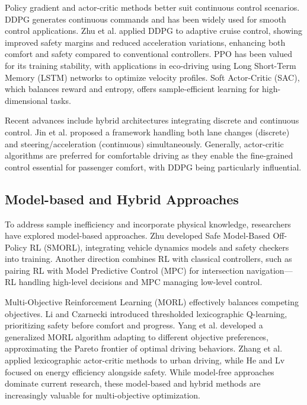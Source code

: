 \documentclass[12pt,a4paper]{article}
\begin{document}
Policy gradient and actor-critic methods better suit continuous control scenarios. DDPG generates continuous commands and has been widely used for smooth control applications. Zhu et al.\cite{zhu2020} applied DDPG to adaptive cruise control, showing improved safety margins and reduced acceleration variations, enhancing both comfort and safety compared to conventional controllers. PPO has been valued for its training stability, with applications in eco-driving using Long Short-Term Memory (LSTM) networks to optimize velocity profiles\cite{zhu2021}. Soft Actor-Critic (SAC), which balances reward and entropy, offers sample-efficient learning for high-dimensional tasks.

Recent advances include hybrid architectures integrating discrete and continuous control. Jin et al.\cite{jin2025} proposed a framework handling both lane changes (discrete) and steering/acceleration (continuous) simultaneously. Generally, actor-critic algorithms are preferred for comfortable driving as they enable the fine-grained control essential for passenger comfort, with DDPG\cite{lillicrap2016} being particularly influential.

\subsection{Model-based and Hybrid Approaches}
To address sample inefficiency and incorporate physical knowledge, researchers have explored model-based approaches. Zhu\cite{zhu2021} developed Safe Model-Based Off-Policy RL (SMORL), integrating vehicle dynamics models and safety checkers into training. Another direction combines RL with classical controllers, such as pairing RL with Model Predictive Control (MPC) for intersection navigation—RL handling high-level decisions and MPC managing low-level control\cite{survey2023}.

Multi-Objective Reinforcement Learning (MORL) effectively balances competing objectives. Li and Czarnecki\cite{li2019} introduced thresholded lexicographic Q-learning, prioritizing safety before comfort and progress. Yang et al.\cite{yang2019} developed a generalized MORL algorithm adapting to different objective preferences, approximating the Pareto frontier of optimal driving behaviors. Zhang et al.\cite{zhang2023} applied lexicographic actor-critic methods to urban driving, while He and Lv\cite{he2023} focused on energy efficiency alongside safety. While model-free approaches dominate current research, these model-based and hybrid methods are increasingly valuable for multi-objective optimization.
\end{document}
